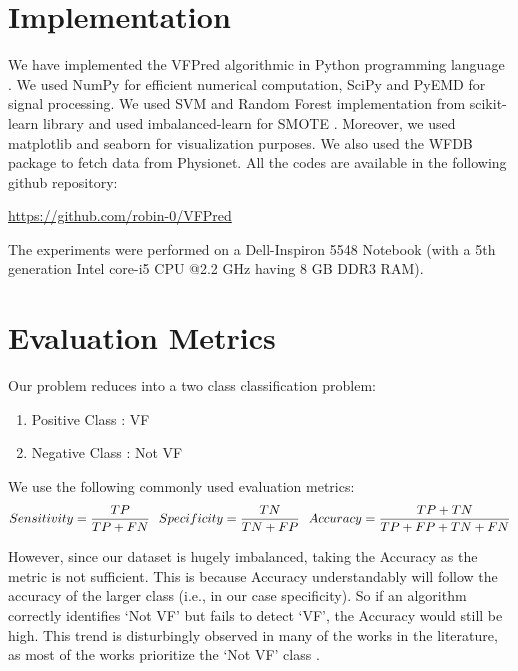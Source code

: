 \documentclass[12pt,a4paper]{article}
\begin{document}
\section{Implementation}

We have implemented the VFPred algorithmic in Python programming language \cite{van2007python}. We used NumPy \cite{walt2011numpy} for efficient numerical computation, SciPy \cite{jones2014scipy} and PyEMD \cite{laszuk2017pyemd} for signal processing. We used SVM and Random Forest implementation from scikit-learn \cite{pedregosa2011scikit} library and used imbalanced-learn \cite{lemaitre2017imbalanced} for SMOTE . Moreover, we used matplotlib and seaborn \cite{hunter2007matplotlib} for visualization purposes. We also used the WFDB package \cite{silva2014open} to fetch data from Physionet. All the codes are available in the following github repository:

\centerline{\url{https://github.com/robin-0/VFPred}}

The experiments were performed on a Dell-Inspiron 5548 Notebook (with a 5th generation Intel core-i5 CPU @2.2 GHz having 8 GB DDR3 RAM).

\section{Evaluation Metrics}

Our problem reduces into a two class classification problem:

\begin{enumerate}
    \item Positive Class : VF
    \item Negative Class : Not VF
\end{enumerate}

We use the following commonly used evaluation metrics:
\begin{equation}
Sensitivity=\frac{TP}{TP+FN}\hspace{0.7em} Specificity=\frac{TN}{TN+FP}\hspace{0.7em}Accuracy=\frac{TP+TN}{TP+FP+TN+FN}
\end{equation}

However, since our dataset is hugely imbalanced, taking the Accuracy as the metric is not sufficient. This is because Accuracy understandably will follow the accuracy of the larger class (i.e., in our case specificity). So if an algorithm correctly identifies `Not VF' but fails to detect `VF', the Accuracy would still be high. This trend is disturbingly observed in many of the works in the literature, as most of the works prioritize the `Not VF' class \cite{anas2011exploiting,amann2005new,amann2007detecting,alonso2012feature,song2005support,asl2008support,acharya2017automated}.
\end{document}
